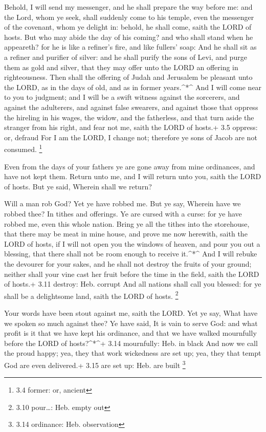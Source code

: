  Behold, I will send my messenger, and he shall prepare the
way before me: and the Lord, whom ye seek, shall suddenly come to his
temple, even the messenger of the covenant, whom ye delight in: behold,
he shall come, saith the LORD of hosts.  But who may abide
the day of his coming? and who shall stand when he appeareth? for he is
like a refiner's fire, and like fullers' soap:  And he shall
sit as a refiner and purifier of silver: and he shall purify the sons of
Levi, and purge them as gold and silver, that they may offer unto the
LORD an offering in righteousness.  Then shall the offering
of Judah and Jerusalem be pleasant unto the LORD, as in the days of old,
and as in former years.\^{}*\^{}  And I will come near to
you to judgment; and I will be a swift witness against the sorcerers,
and against the adulterers, and against false swearers, and against
those that oppress the hireling in his wages, the widow, and the
fatherless, and that turn aside the stranger from his right, and fear
not me, saith the LORD of hosts.+ 3.5 oppress: or, defraud 
For I am the LORD, I change not; therefore ye sons of Jacob are not
consumed. \footnote{3.4 former: or, ancient}

 Even from the days of your fathers ye are gone away from
mine ordinances, and have not kept them. Return unto me, and I will
return unto you, saith the LORD of hosts. But ye said, Wherein shall we
return?

 Will a man rob God? Yet ye have robbed me. But ye say,
Wherein have we robbed thee? In tithes and offerings.  Ye
are cursed with a curse: for ye have robbed me, even this whole nation.
 Bring ye all the tithes into the storehouse, that there
may be meat in mine house, and prove me now herewith, saith the LORD of
hosts, if I will not open you the windows of heaven, and pour you out a
blessing, that there shall not be room enough to receive it.\^{}*\^{}
 And I will rebuke the devourer for your sakes, and he
shall not destroy the fruits of your ground; neither shall your vine
cast her fruit before the time in the field, saith the LORD of hosts.+
3.11 destroy: Heb. corrupt  And all nations shall call you
blessed: for ye shall be a delightsome land, saith the LORD of hosts.
\footnote{3.10 pour\ldots: Heb. empty out}

 Your words have been stout against me, saith the LORD. Yet
ye say, What have we spoken so much against thee?  Ye have
said, It is vain to serve God: and what profit is it that we have kept
his ordinance, and that we have walked mournfully before the LORD of
hosts?\^{}*\^{}+ 3.14 mournfully: Heb. in black  And now we
call the proud happy; yea, they that work wickedness are set up; yea,
they that tempt God are even delivered.+ 3.15 are set up: Heb. are built
\footnote{3.14 ordinance: Heb. observation}

